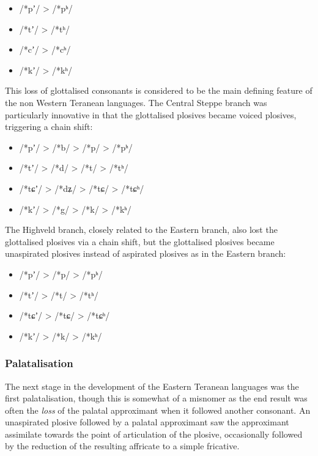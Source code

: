 \documentclass[grammar]{subfiles}
\begin{document}
\begin{itemize}
  \item /*pʼ/ > /*pʰ/  
  \item /*tʼ/ > /*tʰ/  
  \item /*cʼ/ > /*cʰ/  
  \item /*kʼ/ > /*kʰ/  
\end{itemize}

This loss of glottalised consonants is considered to be the main defining
feature of the non Western Teranean languages.  The Central Steppe branch was
particularly innovative in that the glottalised plosives became voiced
plosives, triggering a chain shift:

\begin{itemize}
  \item /*pʼ/ > /*b/ > /*p/ > /*pʰ/  
  \item /*tʼ/ > /*d/ > /*t/ > /*tʰ/  
  \item /*tɕʼ/ > /*dʑ/ > /*tɕ/ > /*tɕʰ/  
  \item /*kʼ/ > /*g/ > /*k/ > /*kʰ/  
\end{itemize}

The Highveld branch, closely related to the Eastern branch, also lost the
glottalised plosives via a chain shift, but the glottalised plosives became unaspirated
plosives instead of aspirated plosives as in the Eastern branch:

\begin{itemize}
  \item /*pʼ/ > /*p/ > /*pʰ/  
  \item /*tʼ/ > /*t/ > /*tʰ/  
  \item /*tɕʼ/ > /*tɕ/ > /*tɕʰ/  
  \item /*kʼ/ > /*k/ > /*kʰ/  
\end{itemize}

\subsubsection{Palatalisation}
\label{sssec:history:east:palatalisation}

The next stage in the development of the Eastern Teranean languages was the
first palatalisation, though this is somewhat of a misnomer as the end result
was often the \emph{loss} of the palatal approximant when it followed another
consonant.  An unaspirated plosive followed by a palatal approximant saw the
approximant assimilate towards the point of articulation of the plosive,
occasionally followed by the reduction of the resulting affricate to a simple
fricative.
\end{document}
